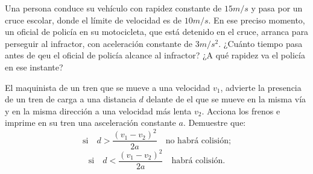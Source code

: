 \begin{mdframed}[style=warning]
	\begin{ejercicio}
		Una persona conduce su vehículo con rapidez constante de $15m/s$ y  pasa por un cruce escolar, donde el límite de velocidad es de $10m/s$. En ese preciso momento, un oficial de policía en su motocicleta, que está detenido en el cruce, arranca para perseguir al infractor, con aceleración constante de $3m/s^2$. ¿Cuánto tiempo pasa antes de qeu el oficial de policía alcance al infractor? ¿A qué rapidez va el policía en ese instante? 
	\end{ejercicio}
\end{mdframed}







\begin{mdframed}[style=warning]
	\begin{ejercicio}
		El maquinista de un tren que se mueve a una velocidad $v_1$, advierte la presencia de un tren de carga a una distancia $d$ delante de el que se mueve en la misma vía y en la misma dirección a una velocidad más lenta $v_2$. Acciona los frenos e imprime en su tren una asceleración constante $a$. Demuestre que:
			$$ \text{si} \quad d > \frac{(v_1 - v_2)^2}{2a} \quad \text{no habrá colisión;} $$
			$$ \text{si} \quad d < \frac{(v_1 - v_2)^2}{2a} \quad \text{habrá colisión.} $$
	\end{ejercicio}
\end{mdframed}





























